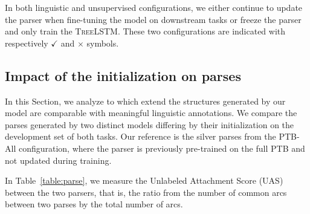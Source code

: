 In both linguistic and unsupervised configurations, we either continue to update the parser when fine-tuning the model on downstream tasks or freeze the parser and only train the \textsc{TreeLSTM}. These two configurations are indicated with respectively \textbf{$\checkmark$} and \textbf{$\times$} symbols. 
% 


\subsection{Impact of the initialization on parses}
\label{sec:parses-impact}




In this Section, we analyze to which extend the structures generated by our model are comparable with meaningful linguistic annotations. We compare the parses generated by two distinct models differing by their initialization on the development set of both tasks. Our reference is the silver parses from the PTB-All configuration, where the parser is previously pre-trained on the full PTB and not updated during training.   


In Table~\ref{table:parse}, we measure the Unlabeled Attachment Score (UAS) between the two parsers, that is, the ratio from the number of common arcs between two parses by the total number of arcs. 


